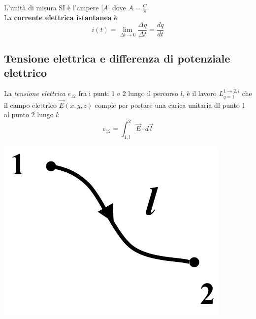 \documentclass{article}
\begin{document}
L'unità di misura SI è l'ampere [$A$] dove $A = \frac{C}{s}$
\vspace*{0.1cm}\\
La \textbf{corrente elettrica istantanea} è:
\[
    i(t) = \lim_{\Delta t \rightarrow 0} \frac{\Delta q}{\Delta t} = \frac{dq}{dt}
\]



\subsection{Tensione elettrica e differenza di potenziale elettrico}
La \textit{tensione elettrica} $e_{12}$ fra i punti 1 e 2 lungo il
percorso $l$, è il lavoro $L^{1\rightarrow 2,l}_{q=1}$ che il campo elettrico
$\vec E(x,y,z)$ compie per portare una carica unitaria dl
punto 1 al punto 2 lungo $l$:
\[
    e_{12} = \int_{1,l}^2 \vec E \cdot d \vec l
\]

\begin{center}
    \includegraphics[scale=0.3]{Image/Tensione.png}
\end{center}
\end{document}
